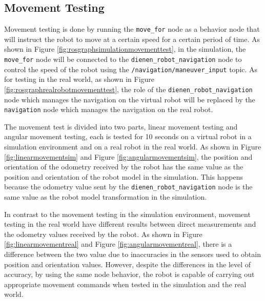 \subsection{Movement Testing}
\label{subsec:movementtesting}




Movement testing is done by running the \lstinline{move_for} node as a behavior node that will instruct the robot to move at a certain speed for a certain period of time.
As shown in Figure \ref{fig:rosgraphsimulationmovementtest},
  in the simulation,
  the \lstinline{move_for} node will be connected to the \lstinline{dienen_robot_navigation} node to control the speed of the robot using the \lstinline{/navigation/maneuver_input} topic.
As for testing in the real world, as shown in Figure \ref{fig:rosgraphrealrobotmovementtest},
  the role of the \lstinline{dienen_robot_navigation} node which manages the navigation on the virtual robot will be replaced by the \lstinline{navigation} node which manages the navigation on the real robot.




The movement test is divided into two parts,
  linear movement testing and angular movement testing,
  each is tested for 10 seconds on a virtual robot in a simulation environment and on a real robot in the real world.
As shown in Figure \ref{fig:linearmovementsim} and Figure \ref{fig:angularmovementsim},
  the position and orientation of the odometry received by the robot has the same value as the position and orientation of the robot model in the simulation.
This happens because the odometry value sent by the \lstinline{dienen_robot_navigation} node is the same value as the robot model transformation in the simulation.




In contrast to the movement testing in the simulation environment,
  movement testing in the real world have different results between direct measurements and the odometry values received by the robot.
As shown in Figure \ref{fig:linearmovementreal} and Figure \ref{fig:angularmovementreal},
  there is a difference between the two value due to inaccuracies in the sensors used to obtain position and orientation values.
However, despite the differences in the level of accuracy, by using the same node behavior,
  the robot is capable of carrying out appropriate movement commands when tested in the simulation and the real world.
